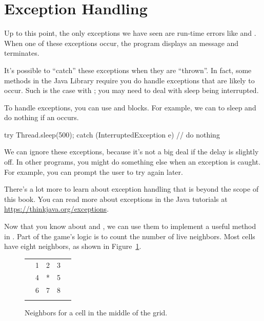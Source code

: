 \section{Exception Handling}

Up to this point, the only exceptions we have seen are run-time errors like  and .
When one of these exceptions occur, the program displays an message and terminates.

It's possible to ``catch'' these exceptions when they are ``thrown''.
In fact, some methods in the Java Library require you do handle exceptions that are likely to occur.
Such is the case with ; you may need to deal with sleep being interrupted.


To handle exceptions, you can use  and  blocks.
For example, we can  to sleep and do nothing if an  occurs.

\begin{code}
try {
    Thread.sleep(500);
} catch (InterruptedException e) {
    // do nothing
}
\end{code}

We can ignore these exceptions, because it's not a big deal if the delay is slightly off.
In other programs, you might do something else when an exception is caught.
For example, you can prompt the user to try again later.


There's a lot more to learn about exception handling that is beyond the scope of this book.
You can read more about exceptions in the Java tutorials at \url{https://thinkjava.org/exceptions}.


Now that you know about  and , we can use them to implement a useful method in .
Part of the game's logic is to count the number of live neighbors.
Most cells have eight neighbors, as shown in Figure~\ref{fig:neighbors}.

\begin{figure}[!ht]
\begin{center}
\begin{tabular}{|p{1em}|p{1em}|p{1em}|p{1em}|p{1em}|}
\hline
  &   &   &   &   \\
\hline
  & 1 & 2 & 3 &   \\
\hline
  & 4 & * & 5 &   \\
\hline
  & 6 & 7 & 8 &   \\
\hline
  &   &   &   &   \\
\hline
\end{tabular}
\caption{Neighbors for a cell in the middle of the grid.}
\label{fig:neighbors}
\end{center}
\end{figure}

